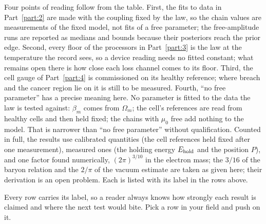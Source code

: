 Four points of reading follow from the table. First, the fits to data in Part~\ref{part:2} are made with the coupling fixed by the
law, so the chain values are measurements of the fixed model, not fits of a free parameter; the free-amplitude runs are reported as
medians and bounds because their posteriors reach the prior edge. Second, every floor of the processors in Part~\ref{part:3} is the law at the temperature the record sees, so a device reading needs no
fitted constant; what remains open there is how close each loss channel comes to its floor. Third, the cell gauge of
Part~\ref{part:4} is commissioned on its healthy reference; where breach and the cancer region lie on it is still to be measured.
Fourth, ``no free parameter'' has a precise meaning here. No parameter is fitted to the data the law is tested against: $\beta_m$ comes from
$\Omega_m$; the cell's references are read from healthy cells and then held fixed; the chains with $\mu_0$ free add nothing to the model. That is
narrower than ``no free parameter'' without qualification. Counted in full, the results use calibrated quantities (the cell references held fixed after one
measurement), measured ones (the holding energy $E_{\rm hold}$ and the position $P$), and one factor found numerically, $(2\pi)^{3/10}$ in the electron
mass; the $3/16$ of the baryon relation and the $2/\pi$ of the vacuum estimate are taken as given here; their derivation is an open problem. Each is listed with its label in the rows above. \interp

Every row carries its label, so a reader always knows how strongly each result is claimed and where the next test would bite. Pick a row in your field and push on it.
